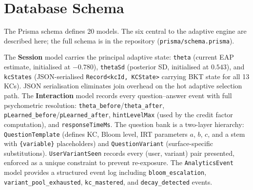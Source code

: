 \section{Database Schema}
\label{sec:impl_schema}

The Prisma schema defines 20 models. The six central to the adaptive engine
are described here; the full schema is in the repository
(\texttt{prisma/schema.prisma}).

The \textbf{Session} model carries the principal adaptive state: \texttt{theta}
(current EAP estimate, initialised at $-0.780$), \texttt{thetaSd} (posterior
SD, initialised at $0.543$), and \texttt{kcStates} (JSON-serialised
\texttt{Record<kcId, KCState>} carrying BKT state for all 13 KCs). JSON
serialisation eliminates join overhead on the hot adaptive selection path.
The \textbf{Interaction} model records every question--answer event with full
psychometric resolution: \texttt{theta\_before}/\texttt{theta\_after},
\texttt{pLearned\_before}/\texttt{pLearned\_after}, \texttt{hintLevelMax}
(used by the credit factor computation), and \texttt{responseTimeMs}.
The question bank is a two-layer hierarchy: \texttt{QuestionTemplate}
(defines KC, Bloom level, IRT parameters $a$, $b$, $c$, and a stem with
\texttt{\{variable\}} placeholders) and \texttt{QuestionVariant} (surface-specific
substitutions). \texttt{UserVariantSeen} records every (user, variant) pair
presented, enforced as a unique constraint to prevent re-exposure. The
\texttt{AnalyticsEvent} model provides a structured event log including
\texttt{bloom\_escalation}, \texttt{variant\_pool\_exhausted},
\texttt{kc\_mastered}, and \texttt{decay\_detected} events.

